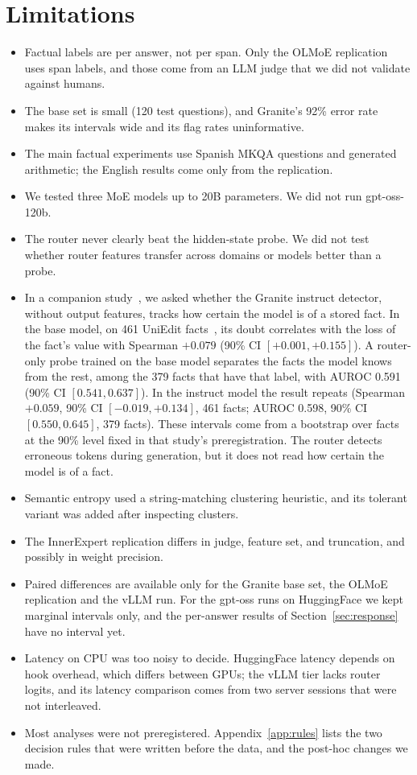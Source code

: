 \documentclass[11pt]{article}
\begin{document}
\section{Limitations}
\label{sec:limits}

\begin{itemize}
  \item Factual labels are per answer, not per span. Only the OLMoE replication uses span labels, and those come from an LLM judge that we did not validate against humans.
  \item The base set is small (120 test questions), and Granite's 92\% error rate makes its intervals wide and its flag rates uninformative.
  \item The main factual experiments use Spanish MKQA questions and generated arithmetic; the English results come only from the replication.
  \item We tested three MoE models up to 20B parameters. We did not run gpt-oss-120b.
  \item The router never clearly beat the hidden-state probe. We did not test whether router features transfer across domains or models better than a probe.
  \item In a companion study~\citep{companion2026forgetting}, we asked whether the Granite instruct detector, without output features, tracks how certain the model is of a stored fact. In the base model, on 461 UniEdit facts~\citep{chen2025uniedit}, its doubt correlates with the loss of the fact's value with Spearman $+0.079$ (90\% CI $[+0.001, +0.155]$). A router-only probe trained on the base model separates the facts the model knows from the rest, among the 379 facts that have that label, with AUROC 0.591 (90\% CI $[0.541, 0.637]$). In the instruct model the result repeats (Spearman $+0.059$, 90\% CI $[-0.019, +0.134]$, 461 facts; AUROC 0.598, 90\% CI $[0.550, 0.645]$, 379 facts). These intervals come from a bootstrap over facts at the 90\% level fixed in that study's preregistration. The router detects erroneous tokens during generation, but it does not read how certain the model is of a fact.
  \item Semantic entropy used a string-matching clustering heuristic, and its tolerant variant was added after inspecting clusters.
  \item The InnerExpert replication differs in judge, feature set, and truncation, and possibly in weight precision.
  \item Paired differences are available only for the Granite base set, the OLMoE replication and the vLLM run. For the gpt-oss runs on HuggingFace we kept marginal intervals only, and the per-answer results of Section~\ref{sec:response} have no interval yet.
  \item Latency on CPU was too noisy to decide. HuggingFace latency depends on hook overhead, which differs between GPUs; the vLLM tier lacks router logits, and its latency comparison comes from two server sessions that were not interleaved.
  \item Most analyses were not preregistered. Appendix~\ref{app:rules} lists the two decision rules that were written before the data, and the post-hoc changes we made.
\end{itemize}
\end{document}
